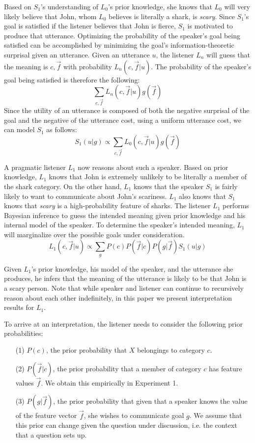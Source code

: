 \documentclass[10pt,letterpaper]{article}
\begin{document}
Based on $S_1$'s understanding of $L_0$'s prior knowledge, she knows that $L_0$ will very likely believe that John, whom $L_0$ believes is literally a shark, is \emph{scary}. Since $S_1$'s goal is satisfied if the listener believes that John is fierce, %
$S_1$ is motivated to produce that utterance. Optimizing the probability of the speaker's goal being satisfied can be accomplished by minimizing the goal's information-theoretic surprisal given an utterance. Given an utterance $u$, the listener $L_n$ will guess that the meaning is $c, \vec f$ with probability $L_n (c, \vec f|u)$. The probability of the speaker's goal being satisfied is therefore the following:
$$
\sum_{c, \vec f}{L_n (c, \vec f|u) g(\vec f)}
$$
Since the utility of an utterance is composed of both the negative surprisal of the goal and the negative of the utterance cost, using a uniform utterance cost, we can model $S_1$ as follows:
$$
S_1 (u | g) \propto \sum_{c,\vec f}{L_0 (c,\vec f|u) g(\vec f)}
$$

A pragmatic listener $L_1$ now reasons about such a speaker. Based on prior knowledge, $L_1$ knows that John is extremely unlikely to be literally a member of the shark category. On the other hand, $L_1$ knows that the speaker $S_1$ is fairly likely to want to communicate about John's scariness. $L_1$ also knows that $S_1$ knows that \emph{scary} is a high-probability feature of sharks. The listener $L_1$ performs Bayesian inference to guess the intended meaning given prior knowledge and his internal model of the speaker. To determine the speaker's intended meaning, $L_1$ will marginalize over the possible goals under consideration.
$$
L_1 (c, \vec f | u) \propto \sum_{g}{P(c) P(\vec f | c) P (g|\vec f) S_{1} (u|g)}
$$

Given $L_1$'s prior knowledge, his model of the speaker, and the utterance she produces, he infers that the meaning of the utterance is likely to be that John is a scary person. Note that while speaker and listener can continue to recursively reason about each other indefinitely, in this paper we present interpretation results for $L_1$.

To arrive at an interpretation, the listener needs to consider the following prior probabilities: 
\begin{itemize}
\item[(1)] $P(c)$, the prior probability that $X$ belongings to category $c$.
\item[(2)] $P(\vec f | c)$, the prior probability that a member of category $c$ has feature values $\vec f$. We obtain this empirically in Experiment 1.
\item[(3)] $P(g | \vec f)$, the prior probability that given that a speaker knows the value of the feature vector $\vec f$, she wishes to communicate goal $g$. We assume that this prior can change given the question under discussion, i.e. the context that a question sets up. 
\end{itemize}
\end{document}
